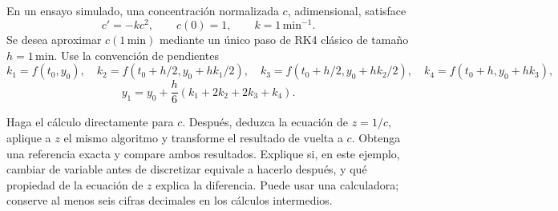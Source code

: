 En un ensayo simulado, una concentración normalizada \(c\), adimensional, satisface
\[
c'=-kc^2,\qquad c(0)=1,\qquad k=1\,\mathrm{min}^{-1}.
\]
Se desea aproximar \(c(1\,\mathrm{min})\) mediante un único paso de RK4 clásico de tamaño \(h=1\,\mathrm{min}\). Use la convención de pendientes
\[
k_1=f(t_0,y_0),\quad k_2=f(t_0+h/2,y_0+hk_1/2),\quad
k_3=f(t_0+h/2,y_0+hk_2/2),\quad k_4=f(t_0+h,y_0+hk_3),
\]
\[
y_1=y_0+\frac h6(k_1+2k_2+2k_3+k_4).
\]

Haga el cálculo directamente para \(c\). Después, deduzca la ecuación de \(z=1/c\), aplique a \(z\) el mismo algoritmo y transforme el resultado de vuelta a \(c\). Obtenga una referencia exacta y compare ambos resultados. Explique si, en este ejemplo, cambiar de variable antes de discretizar equivale a hacerlo después, y qué propiedad de la ecuación de \(z\) explica la diferencia. Puede usar una calculadora; conserve al menos seis cifras decimales en los cálculos intermedios.
